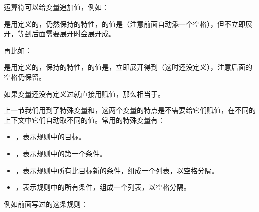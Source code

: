 \BookCode{+\BookSplit{}=\BookSplit{}}运算符可以给变量追加值，例如：




是用\BookCode{=\BookSplit{}}定义的，\BookCode{+\BookSplit{}=\BookSplit{}}仍然保持\BookCode{=\BookSplit{}}的特性，的值是（注意前面自动添一个空格），但不立即展开，等到后面需要展开时会展开成。



再比如：




是用\BookCode{:\BookSplit{}=\BookSplit{}}定义的，\BookCode{+\BookSplit{}=\BookSplit{}}保持\BookCode{:\BookSplit{}=\BookSplit{}}的特性，的值是，立即展开得到（这时还没定义），注意后面的空格仍保留。



如果变量还没有定义过就直接用\BookCode{+\BookSplit{}=\BookSplit{}}赋值，那么\BookCode{+\BookSplit{}=\BookSplit{}}相当于\BookCode{=\BookSplit{}}。



上一节我们用到了特殊变量和\BookCode{\$\textless{}}，这两个变量的特点是不需要给它们赋值，在不同的上下文中它们自动取不同的值。常用的特殊变量有：


\begin{itemize}

\item {}，表示规则中的目标。

\item \BookCode{\$\textless{}}，表示规则中的第一个条件。

\item {}，表示规则中所有比目标新的条件，组成一个列表，以空格分隔。

\item \BookCode{\$\textasciicircum{}}，表示规则中的所有条件，组成一个列表，以空格分隔。
\end{itemize}


例如前面写过的这条规则：




